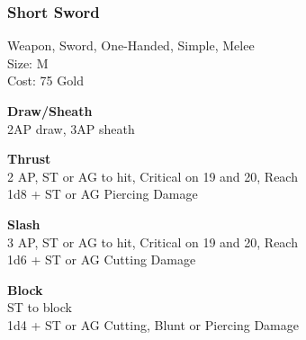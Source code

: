 \subsubsection{Short Sword}\label{weapon:shortSword}
Weapon, Sword, One-Handed, Simple, Melee\\
Size: M\\
Cost: 75 Gold

\textbf{Draw/Sheath}\\
2AP draw, 3AP sheath

\textbf{Thrust}\\
2 AP, ST or AG to hit, Critical on 19 and 20,  Reach\\
1d8 + \texttimes ST or AG Piercing Damage

\textbf{Slash}\\
3 AP, ST or AG to hit, Critical on 19 and 20,  Reach\\
1d6 + \texttimes ST or AG Cutting Damage

\textbf{Block}\\
ST to block\\
1d4 + \texttimes ST or AG Cutting, Blunt or Piercing Damage

